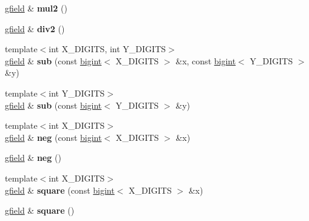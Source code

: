 \begin{DoxyCompactItemize}
\hyperlink{structgfield}{gfield} \& {\bfseries mul2} ()
\item 
\mbox{\label{structgfield_abc7d6d9d3fbc4c2ef13f05ab41e3f1c1}} 
\hyperlink{structgfield}{gfield} \& {\bfseries div2} ()
\item 
\mbox{\label{structgfield_a7b28f9e10bd7425d2ccf855cde3daedb}} 
{\footnotesize template$<$int X\+\_\+\+D\+I\+G\+I\+TS, int Y\+\_\+\+D\+I\+G\+I\+TS$>$ }\\\hyperlink{structgfield}{gfield} \& {\bfseries sub} (const \hyperlink{structbigint}{bigint}$<$ X\+\_\+\+D\+I\+G\+I\+TS $>$ \&x, const \hyperlink{structbigint}{bigint}$<$ Y\+\_\+\+D\+I\+G\+I\+TS $>$ \&y)
\item 
\mbox{\label{structgfield_a60e81a7e630ccbd0367b20d879d662ab}} 
{\footnotesize template$<$int Y\+\_\+\+D\+I\+G\+I\+TS$>$ }\\\hyperlink{structgfield}{gfield} \& {\bfseries sub} (const \hyperlink{structbigint}{bigint}$<$ Y\+\_\+\+D\+I\+G\+I\+TS $>$ \&y)
\item 
\mbox{\label{structgfield_a1813a78e8ffda06a084c66c8fada2bbf}} 
{\footnotesize template$<$int X\+\_\+\+D\+I\+G\+I\+TS$>$ }\\\hyperlink{structgfield}{gfield} \& {\bfseries neg} (const \hyperlink{structbigint}{bigint}$<$ X\+\_\+\+D\+I\+G\+I\+TS $>$ \&x)
\item 
\mbox{\label{structgfield_a80de574023c5397b3764642eb40d5b2b}} 
\hyperlink{structgfield}{gfield} \& {\bfseries neg} ()
\item 
\mbox{\label{structgfield_aa5bd3792b7eddf8b871a249e3bc0db95}} 
{\footnotesize template$<$int X\+\_\+\+D\+I\+G\+I\+TS$>$ }\\\hyperlink{structgfield}{gfield} \& {\bfseries square} (const \hyperlink{structbigint}{bigint}$<$ X\+\_\+\+D\+I\+G\+I\+TS $>$ \&x)
\item 
\mbox{\label{structgfield_a61ec85b051991f5fa9cbfca68055aa12}} 
\hyperlink{structgfield}{gfield} \& {\bfseries square} ()
\item 
\mbox{\label{structgfield_a77a81289eedc79b01a32bfe2e8fa131b}} 

\end{DoxyCompactItemize}
